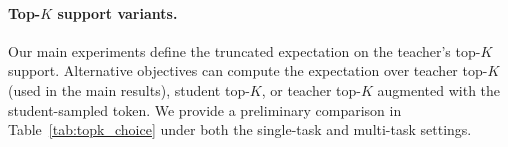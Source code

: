 \documentclass{article}
\begin{document}
\paragraph{Top-$K$ support variants.}
Our main experiments define the truncated expectation on the teacher's top-$K$ support.
Alternative objectives can compute the expectation over teacher top-$K$ (used in the main results), student top-$K$, or teacher top-$K$ augmented with the student-sampled token. We provide a preliminary comparison in Table~\ref{tab:topk_choice} under both the single-task and multi-task settings.

\begin{table}[t]
\centering

\begin{subtable}{\linewidth}
\centering
\small
{}
\caption{Alternative KL expectation supports in the single-task setting.}
\label{tab:kl_expectation_single}
\end{subtable}

\vspace{1em}


\end{table}
\end{document}
